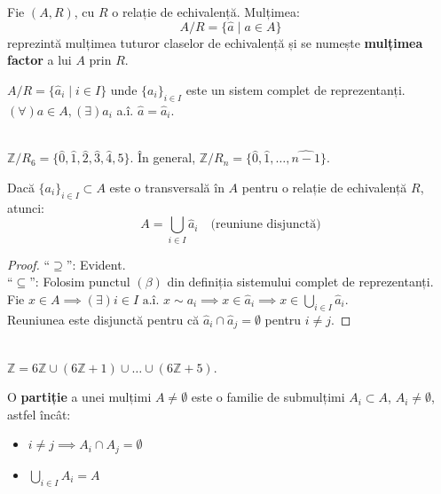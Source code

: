 \begin{definition}
Fie $(A, R)$, cu $R$ o relație de echivalență. Mulțimea:
$$ A/R = \{\hat{a} \mid a \in A\} $$
reprezintă mulțimea tuturor claselor de echivalență și se numește \textbf{mulțimea factor} a lui $A$ prin $R$.
\end{definition}

\begin{proposition}
$A/R = \{\hat{a}_i \mid i \in I\}$ unde $\{a_i\}_{i \in I}$ este un sistem complet de reprezentanți. \\
$(\forall) a \in A, (\exists) a_i$ a.î. $\hat{a} = \hat{a}_i$.
\end{proposition}

\begin{example}\mbox{}\\
$\mathbb{Z}/R_6 = \{\hat{0}, \hat{1}, \hat{2}, \hat{3}, \hat{4}, \hat{5}\}$. În general, $\mathbb{Z}/R_n = \{\hat{0}, \hat{1}, \dots, \widehat{n-1}\}$.
\end{example}

\begin{remark}
Dacă $\{a_i\}_{i \in I} \subset A$ este o transversală în $A$ pentru o relație de echivalență $R$, atunci:
$$ A = \bigcup_{i \in I} \hat{a}_i \quad \text{(reuniune disjunctă)} $$
\end{remark}

\begin{proof}
``$\supseteq$'': Evident. \\
``$\subseteq$'': Folosim punctul $(\beta)$ din definiția sistemului complet de reprezentanți. \\
Fie $x \in A \implies (\exists) i \in I \text{ a.î. } x \sim a_i \implies x \in \hat{a}_i \implies x \in \bigcup_{i \in I} \hat{a}_i$. \\
Reuniunea este disjunctă pentru că $\hat{a}_i \cap \hat{a}_j = \emptyset$ pentru $i \neq j$.
\end{proof}

\begin{example}\mbox{}\\
$\mathbb{Z} = 6\mathbb{Z} \cup (6\mathbb{Z}+1) \cup \dots \cup (6\mathbb{Z}+5)$.
\end{example}


\begin{definition}
O \textbf{partiție} a unei mulțimi $A \neq \emptyset$ este o familie de submulțimi $A_i \subset A$, $A_i \neq \emptyset$, astfel încât:
\begin{itemize}
    \item $i \neq j \implies A_i \cap A_j = \emptyset$
    \item $\bigcup_{i \in I} A_i = A$
\end{itemize}

\begin{center}
\end{center}
\end{definition}

